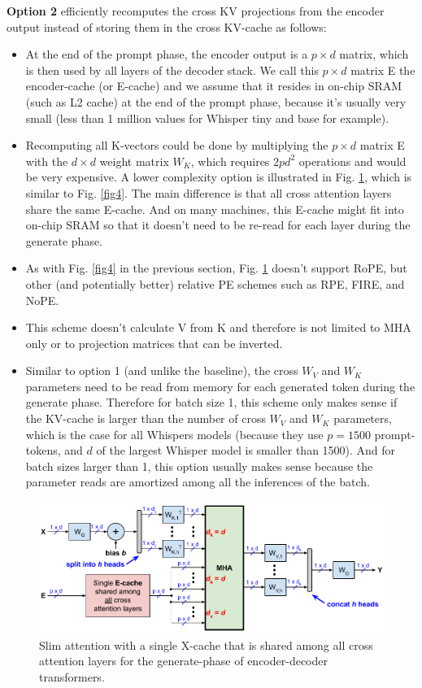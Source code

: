 \documentclass{article}
\numberwithin{equation}{section} %
\begin{document}
\textbf{Option 2} efficiently recomputes the cross KV projections from the encoder output instead of storing them in the cross KV-cache as follows:
\begin{itemize}[topsep=-1pt, itemsep=-1pt]
  \item At the end of the prompt phase, the encoder output is a $p \times d$ matrix, which is then used by all layers of the decoder stack. We call this $p \times d$ matrix E the encoder-cache (or E-cache) and we assume that it resides in on-chip SRAM (such as L2 cache) at the end of the prompt phase, because it’s usually very small (less than 1 million values for Whisper tiny and base for example).
  \item Recomputing all K-vectors could be done by multiplying the $p \times d$ matrix E with the $d \times d$ weight matrix $W_K$, which requires $2 p d^2$ operations and would be very expensive. A lower complexity option is illustrated in Fig. \ref{fig5}, which is similar to Fig. \ref{fig4}. The main difference is that all cross attention layers share the same E-cache. And on many machines, this E-cache might fit into on-chip SRAM so that it doesn’t need to be re-read for each layer during the generate phase.
  \item As with Fig. \ref{fig4} in the previous section, Fig. \ref{fig5} doesn’t support RoPE, but other (and potentially better) relative PE schemes such as RPE, FIRE, and NoPE.
  \item This scheme doesn’t calculate V from K and therefore is not limited to MHA only or to projection matrices that can be inverted.
  \item Similar to option 1 (and unlike the baseline), the cross $W_V$ and $W_K$ parameters need to be read from memory for each generated token during the generate phase. Therefore for batch size 1, this scheme only makes sense if the KV-cache is larger than the number of cross $W_V$ and $W_K$ parameters, which is the case for all Whispers models (because they use $p = 1500$ prompt-tokens, and $d$ of the largest Whisper model is smaller than 1500). And for batch sizes larger than 1, this option usually makes sense because the parameter reads are amortized among all the inferences of the batch.
\end{itemize}

\begin{figure}[h!] \centering
  \includegraphics[scale=0.9]{figs/slim_fig5.pdf}
  \caption{Slim attention with a single X-cache that is shared among all cross attention layers for the generate-phase of encoder-decoder transformers.}
\label{fig5} \end{figure}
\end{document}
